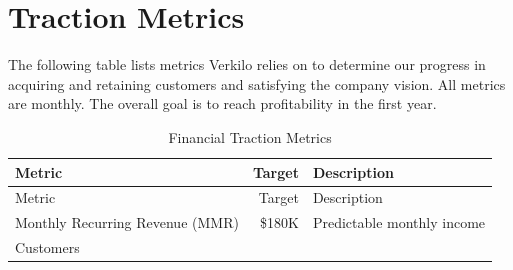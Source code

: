 \documentclass[11pt,openany]{book}
\begin{document}
\hypertarget{traction-metrics}{%
\section{Traction Metrics}\label{traction-metrics}}

The following table lists metrics Verkilo relies on to determine our
progress in acquiring and retaining customers and satisfying the company
vision. All metrics are monthly. The overall goal is to reach
profitability in the first year.

\begin{longtable}[]{@{}lrl@{}}
\caption{Financial Traction Metrics}\tabularnewline
\toprule
\begin{minipage}[b]{0.35\columnwidth}\raggedright
Metric\strut
\end{minipage} & \begin{minipage}[b]{0.08\columnwidth}\raggedleft
Target\strut
\end{minipage} & \begin{minipage}[b]{0.48\columnwidth}\raggedright
Description\strut
\end{minipage}\tabularnewline
\midrule
\endfirsthead
\toprule
\begin{minipage}[b]{0.35\columnwidth}\raggedright
Metric\strut
\end{minipage} & \begin{minipage}[b]{0.08\columnwidth}\raggedleft
Target\strut
\end{minipage} & \begin{minipage}[b]{0.48\columnwidth}\raggedright
Description\strut
\end{minipage}\tabularnewline
\midrule
\endhead
\begin{minipage}[t]{0.35\columnwidth}\raggedright
Monthly Recurring Revenue (MMR)\strut
\end{minipage} & \begin{minipage}[t]{0.08\columnwidth}\raggedleft
\$180K\strut
\end{minipage} & \begin{minipage}[t]{0.48\columnwidth}\raggedright
Predictable monthly income\strut
\end{minipage}\tabularnewline
\begin{minipage}[t]{0.35\columnwidth}\raggedright
Customers\strut
\end{minipage} & \begin{minipage}[t]{0.08\columnwidth}\raggedleft
2250\strut
\end{minipage} & \begin{minipage}[t]{0.48\columnwidth}\raggedright

\end{minipage}
\end{longtable}
\end{document}
